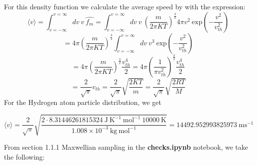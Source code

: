 \documentclass[12pt]{article}
\begin{document}
	For this density function we calculate the average speed by with the expression:
	$$ \langle v\rangle = \int_{v = - \infty}^{v = \infty} d v \: v \: \widehat{f_{m}} = \int_{v = - \infty}^{v = \infty} d v \: v \: \left(\frac{m}{2\pi KT}\right)^{\frac{3}{2}} 4 \pi v^{2} \: \mathrm{exp}\left(-\frac{v^{2}}{v_{th}^{2}}\right)$$
	$$=  4 \pi \left(\frac{m}{2\pi KT}\right)^{\frac{3}{2}} \int_{v = - \infty}^{v = \infty} d v \: v^{3} \: \mathrm{exp}\left(-\frac{v^{2}}{v_{th}^{2}}\right)$$ $$ = 4 \pi \left(\frac{m}{2\pi KT}\right)^{\frac{3}{2}} \frac{v_{th}^{4}}{2} = 4 \pi \left(\frac{1}{\pi v_{th}^{2}}\right)^{\frac{3}{2}} \frac{v_{th}^{4}}{2}$$ $$= \frac{2}{\sqrt{\pi}} v_{th} = \frac{2}{\sqrt{\pi}} \sqrt{\frac{2 K T}{m}} = \frac{2}{\sqrt{\pi}} \sqrt{\frac{2 R T}{M}}$$ 
	For the Hydrogen atom particle distribution, we get \begin{tcolorbox}
		$$\langle v\rangle = \frac{2}{\sqrt{\pi}} \sqrt{\frac{2 \cdot 8.31446261815324 \: \mathrm{J} \: \mathrm{K}^{-1} \: \mathrm{mol}^{-1} \: 10000 \: \mathrm{K}}{1.008 \times 10^{-3} \: \mathrm{kg} \: \mathrm{mol}^{-1}}} = 14492.952993825973 \: \mathrm{m}\mathrm{s}^{-1}$$
	\end{tcolorbox}
	
	From section 1.1.1 Maxwellian sampling in the \textbf{checks.ipynb} notebook, we take the following:
	
\end{document}
